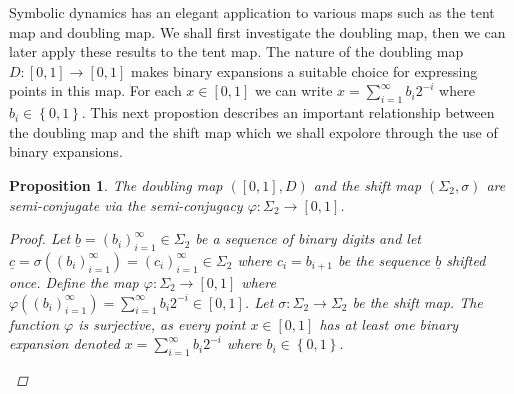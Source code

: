 \documentclass[11pt,a4paper,oneside]{memoir}
\theoremstyle{plain}
\newtheorem{prop}[thm]{Proposition}
\theoremstyle{definition}
\begin{document}
Symbolic dynamics has an elegant application to various maps such as the tent map and doubling map. We shall first investigate the doubling map, then we can later apply these results to the tent map. The nature of the doubling map $D: [0, 1] \to [0, 1]$ makes binary expansions a suitable choice for expressing points in this map. For each $x \in [0, 1]$ we can write $x=\sum_{i=1}^{\infty}b_i2^{-i}$ where $b_i \in \left\lbrace 0, 1 \right\rbrace$. This next propostion describes an important relationship between the doubling map and the shift map which we shall expolore through the use of binary expansions.

\begin{prop} \label{prop:doubling-shift-semi-conjugate}
    The doubling map $([0, 1], D)$ and the shift map $(\Sigma_2, \sigma)$ are semi-conjugate via the semi-conjugacy $\varphi: \Sigma_2 \to [0, 1]$.
    \begin{proof}
        Let $\underline{b} = (b_i)_{i=1}^{\infty} \in \Sigma_2$ be a sequence of binary digits and let $\underline{c} = \sigma\left((b_i)_{i=1}^{\infty}\right) = (c_i)_{i=1}^{\infty} \in \Sigma_2$ where $c_i = b_{i + 1}$ be the sequence $\underline{b}$ shifted once. Define the map $\varphi: \Sigma_2 \to [0, 1]$ where $\varphi\left((b_i)_{i=1}^{\infty}\right) = \sum_{i=1}^{\infty} b_i2^{-i} \in [0, 1]$. Let $\sigma: \Sigma_2 \to \Sigma_2$ be the shift map. The function $\varphi$ is surjective, as every point $x \in [0, 1]$ has at least one binary expansion denoted $x=\sum_{i=1}^{\infty}b_i2^{-i}$ where $b_i \in \left\lbrace 0, 1 \right\rbrace$.
        \begin{center}
\end{center}
\end{proof}
\end{prop}
\end{document}
